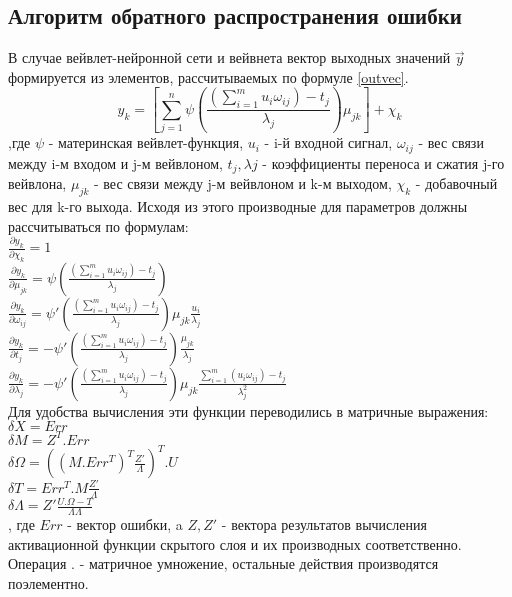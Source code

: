 \documentclass[utf8,usehyperref,14pt]{G7-32}
\begin{document}
\subsection{Алгоритм обратного распространения ошибки}
В случае вейвлет-нейронной сети и вейвнета вектор выходных значений $ \vec{y} $ формируется из элементов, рассчитываемых по формуле \eqref{outvec}. 
\begin{equation}
y_{k} = [\sum_{j=1}^{n}\psi(\frac{(\sum_{i=1}^{m}u_{i}\omega_{ij})-t_{j}}{\lambda_{j}})\mu_{jk}]+\chi_{k}
\label{outvec}
\end{equation}
,где $ \psi $ - материнская вейвлет-функция, $ u_{i} $ - i-й входной сигнал, $ \omega_{ij} $ - вес связи между i-м входом и j-м вейвлоном, $ t_{j}, \lambda{j} $ - коэффициенты переноса и сжатия j-го вейвлона, $ \mu_{jk} $ - вес связи между j-м вейвлоном и k-м выходом, $ \chi_{k} $ - добавочный вес для k-го выхода.
Исходя из этого производные для параметров должны рассчитываться по формулам:\\
$ \frac{\partial{y_{k}}}{\partial{\chi_{k}}} = 1 $\\
$ \frac{\partial{y_{k}}}{\partial{\mu_{jk}}} = \psi(\frac{(\sum_{i=1}^{m}u_{i}\omega_{ij})-t_{j}}{\lambda_{j}}) $\\
$ \frac{\partial{y_{k}}}{\partial{\omega_{ij}}} = \psi'(\frac{(\sum_{i=1}^{m}u_{i}\omega_{ij})-t_{j}}{\lambda_{j}})\mu_{jk}\frac{u_{i}}{\lambda_{j}} $\\
$ \frac{\partial{y_{k}}}{\partial{t_{j}}} = -\psi'(\frac{(\sum_{i=1}^{m}u_{i}\omega_{ij})-t_{j}}{\lambda_{j}})\frac{\mu_{jk}}{\lambda_{j}} $\\
$ \frac{\partial{y_{k}}}{\partial{\lambda_{j}}} = -\psi'(\frac{(\sum_{i=1}^{m}u_{i}\omega_{ij})-t_{j}}{\lambda_{j}})\mu_{jk}\frac{\sum_{i=1}^{m}(u_{i}\omega_{ij})-t_{j}}{\lambda_{j}^{2}} $\\
Для удобства вычисления эти функции переводились в матричные выражения:\\
$ \delta X = Err $\\
$ \delta M = Z^{T}.Err $\\
$ \delta \Omega = ((M.Err^{T})^{T}\frac{Z'}{\Lambda})^{T}.U $\\
$ \delta T = Err^{T}.M\frac{Z'}{\Lambda} $\\
$ \delta \Lambda = Z'\frac{U.\Omega-T}{\Lambda\Lambda} $\\
, где $ Err $ - вектор ошибки, a $ Z, Z' $ - вектора результатов вычисления активационной функции скрытого слоя и их производных соответственно. Операция . - матричное умножение, остальные действия производятся поэлементно.
\end{document}
